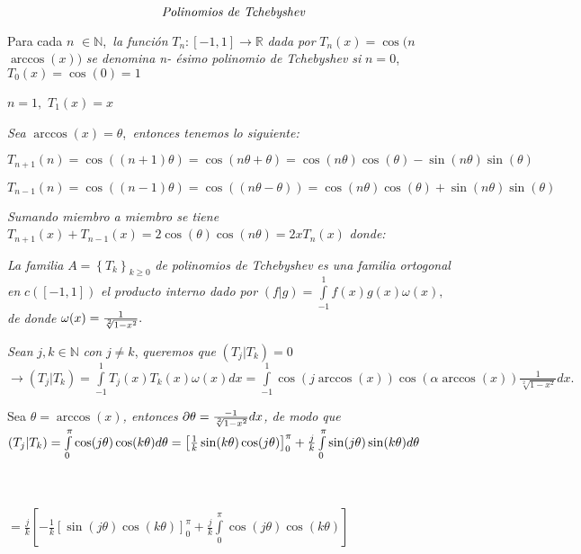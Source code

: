 \documentclass{article}
\begin{document}
\[
\text{\emph{Polinomios de Tchebyshev}} 
\]


Para cada $n$ $\in 
\mathbb{N}
$,\textit{\ la funci\'{o}n }$T_{n}:\left[ -1,1\right] \rightarrow 
\mathbb{R}
$ \textit{dada por }$T_{n}(x)=\cos (n$ $\arccos (x))$ \textit{se denomina n-%
\'{e}simo polinomio de Tchebyshev si }$n=0$, $T_{0}(x)=\cos (0)=1$

$n=1,$ $T_{1}(x)=x$

\textit{Sea }$\arccos (x)=\theta $,\textit{\ entonces tenemos lo siguiente:}

$T_{n+1}(n)=\cos ((n+1)\theta )=\cos (n\theta +\theta )=\cos (n\theta )\cos
(\theta )-\sin (n\theta )\sin (\theta )$

$T_{n-1}(n)=\cos ((n-1)\theta )=\cos ((n\theta -\theta ))=\cos (n\theta
)\cos (\theta )+\sin (n\theta )\sin (\theta )$

\textit{Sumando miembro a miembro se tiene }$T_{n+1}(x)+T_{n-1}(x)=2\cos
(\theta )\cos (n\theta )=2xT_{n}(x)$ \textit{donde: }


\textit{La familia }$A=\left\{ T_{k}\right\} _{k\geq 0}$ \textit{de
polinomios de Tchebyshev es una familia ortogonal en }$c(\left[ -1,1\right]
) $ \textit{el producto interno dado por }$(f|g)=\int%
\limits_{-1}^{1}f(x)g(x)\omega (x),$ \textit{de donde }$\omega (x)=\frac{1}{%
\sqrt[2]{1-x^{2}}}.$


\textit{Sean }$j,k\in 
\mathbb{N}
$ \textit{con }$j\neq k$, \textit{queremos que }$(T_{j}|T_{k})=0$ $%
\rightarrow (T_{j}|T_{k})=\int\limits_{-1}^{1}T_{j}(x)T_{k}(x)\omega
(x)dx=\int\limits_{-1}^{1}\cos (j\arccos (x))\cos (\alpha \arccos (x))\frac{1%
}{\sqrt[2]{1-x^{2}}}dx.$

Sea $\theta =\arccos (x)$\textit{, entonces }$\partial \theta =\frac{-1}{%
\sqrt[2]{1-x^{2}}}dx$\textit{, de modo que }$(T_{j}|T_{k})=\int\limits_{0}^{%
\pi }\cos (j\theta )\cos (k\theta )d\theta =\left[ \frac{1}{k}\sin (k\theta
)\cos (j\theta )\right] _{0}^{\pi }+\frac{j}{k}\int\limits_{0}^{\pi }\sin
(j\theta )\sin (k\theta )d\theta $

\ \ \ \ \ \ \ \ \ \ \ \ \ \ \ \ \ \ \ \ \ \ \ \ \ \ \ \ \ \ \ \ \ \ \ \ \ \
\ \ \ \ \ \ \ \ \ \ \ \ \ \ \ \ \ \ \ \ \ \ \ \ \ \ \ \ \ \ \ \ \ \ \ \ \ \
\ \ \ \ \ \ \ \ \ \ \ \ \ \ \ \ \ \ \ $=\frac{j}{k}\left[ -\frac{1}{k}\left[
\sin (j\theta )\cos (k\theta )\right] _{0}^{\pi }+\frac{j}{k}%
\int\limits_{0}^{\pi }\cos (j\theta )\cos (k\theta )\right] $
\end{document}
